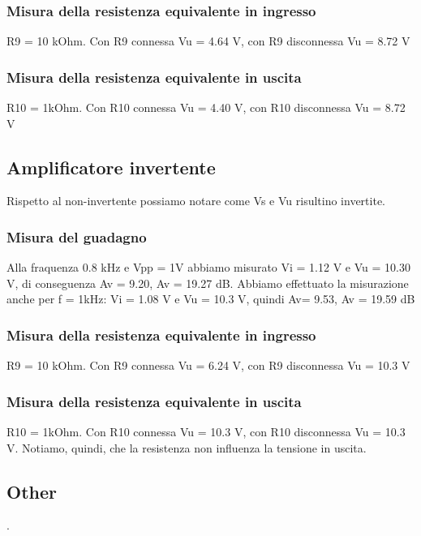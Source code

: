 \documentclass[a4paper]{article}
\begin{document}
			\subsubsection{Misura della resistenza equivalente in ingresso}	
				R9 = 10 kOhm.
				Con R9 connessa Vu = 4.64 V, con R9 disconnessa Vu = 8.72 V
			\subsubsection{Misura della resistenza equivalente in uscita}
				R10 = 1kOhm.
				Con R10 connessa Vu = 4.40 V, con R10 disconnessa Vu = 8.72 V
		\subsection{Amplificatore invertente}
			Rispetto al non-invertente possiamo notare come Vs e Vu risultino invertite. 
			\subsubsection{Misura del guadagno}
				Alla fraquenza 0.8 kHz e Vpp = 1V abbiamo misurato Vi = 1.12 V e Vu = 10.30 V, di conseguenza Av = 9.20, Av = 19.27 dB. 
				Abbiamo effettuato la misurazione anche per f = 1kHz:
				Vi = 1.08 V e Vu = 10.3 V, quindi Av= 9.53, Av = 19.59 dB
			\subsubsection{Misura della resistenza equivalente in ingresso}	
				R9 = 10 kOhm.
				Con R9 connessa Vu = 6.24 V, con R9 disconnessa Vu = 10.3 V
			\subsubsection{Misura della resistenza equivalente in uscita}	
				R10 = 1kOhm.
				Con R10 connessa Vu = 10.3 V, con R10 disconnessa Vu = 10.3 V.
				Notiamo, quindi, che la resistenza non influenza la tensione in uscita.
		\subsection{Other}
			.
\end{document}
